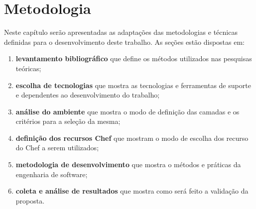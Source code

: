 \chapter{Metodologia}
\label{chap:metod}

Neste capítulo serão apresentadas as adaptações das metodologias e técnicas
definidas para o desenvolvimento deste trabalho. As seções estão dispostas
em:
\begin{enumerate}
  \item \textbf{levantamento bibliográfico} que define os métodos utilizados nas
    pesquisas teóricas;
  \item \textbf{escolha de tecnologias} que mostra as tecnologias e
    ferramentas de suporte e dependentes ao desenvolvimento do trabalho;
  \item \textbf{análise do ambiente} que mostra o modo de definição das camadas e os critérios para
    a seleção da mesma;
  \item \textbf{definição dos recursos Chef} que mostram o modo de escolha dos recurso do Chef a serem utilizados;
  \item \textbf{metodologia de desenvolvimento} que mostra o métodos e práticas da engenharia de software;
  \item \textbf{coleta e análise de resultados} que mostra como será feito a validação da proposta.
\end{enumerate}







